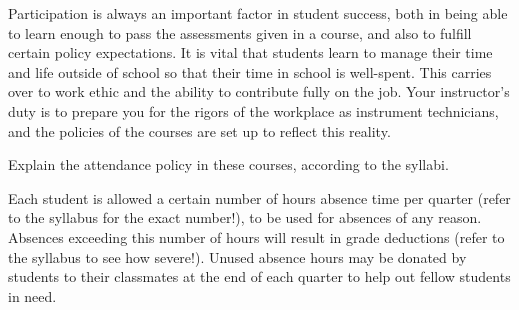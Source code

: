 

Participation is always an important factor in student success, both in being able to learn enough to pass the assessments given in a course, and also to fulfill certain policy expectations.  It is vital that students learn to manage their time and life outside of school so that their time in school is well-spent.  This carries over to work ethic and the ability to contribute fully on the job.  Your instructor's duty is to prepare you for the rigors of the workplace as instrument technicians, and the policies of the courses are set up to reflect this reality.

\vskip 10pt

Explain the attendance policy in these courses, according to the syllabi.







Each student is allowed a certain number of hours absence time per quarter (refer to the syllabus for the exact number!), to be used for absences of any reason.  Absences exceeding this number of hours will result in grade deductions (refer to the syllabus to see how severe!).  Unused absence hours may be donated by students to their classmates at the end of each quarter to help out fellow students in need.











